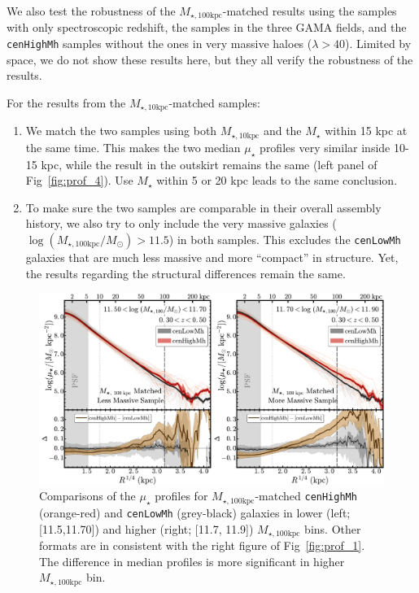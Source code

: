 \documentclass[a4paper,fleqn,usenatbib]{mnras}
\def\rbcg{\texttt{cenHighMh}}
\def\nbcg{\texttt{cenLowMh}}
\def\mstar{{$M_{\star}$}}
\def\minn{{$M_{\star,10\mathrm{kpc}}$}}
\def\mtot{{$M_{\star,100\mathrm{kpc}}$}}
\def\logmtot{{$\log (M_{\star,100\mathrm{kpc}}/M_{\odot})$}}
\def\mden{{$\mu_{\star}$}}
\begin{document}
    We also test the robustness of the \mtot{}-matched results using the samples with 
    only spectroscopic redshift, the samples in the three GAMA fields, and the \rbcg{} 
    samples without the ones in very massive haloes ($\lambda > 40$).  
    Limited by space, we do not show these results here, but they all verify the 
    robustness of the results. 
    
    For the results from the \minn{}-matched samples: 
    
    \begin{enumerate}
    
        \item
            We match the two samples using both \minn{} and the \mstar{} within 15 kpc 
            at the same time.  
            This makes the two median \mden{} profiles very similar inside 10-15 
            kpc, while the result in the outskirt remains the same (left panel of 
            Fig~\ref{fig:prof_4}).
            Use \mstar{} within 5 or 20 kpc leads to the same conclusion. 
          
        \item 
            To make sure the two samples are comparable in their overall assembly history,
            we also try to only include the very massive galaxies (\logmtot{}$>11.5$)
            in both samples. 
            This excludes the \nbcg{} galaxies that are much less massive and 
            more ``compact'' in structure. 
            Yet, the results regarding the structural differences remain the same. 
          
    \end{enumerate}

  \begin{figure}
      \centering 
      \includegraphics[width=\textwidth]{fig/redbcg_prof_2}
      \caption{
          Comparisons of the \mden{} profiles for \mtot{}-matched \rbcg{} 
          (orange-red) and \nbcg{} (grey-black) galaxies in lower (left; [11.5,11.70]) 
          and higher (right; [11.7, 11.9]) \mtot{} bins. 
          Other formats are in consistent with the right figure of Fig~\ref{fig:prof_1}.
          The difference in median profiles is more significant in higher \mtot{} bin.
          }
      \label{fig:prof_2}
  \end{figure}
\end{document}
